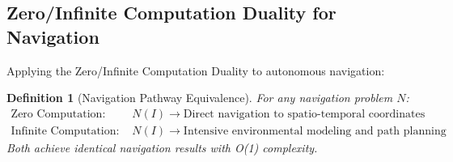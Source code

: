 \documentclass[12pt,a4paper]{article}
\newtheorem{definition}[theorem]{Definition}
\begin{document}
\subsection{Zero/Infinite Computation Duality for Navigation}

Applying the Zero/Infinite Computation Duality to autonomous navigation:

\begin{definition}[Navigation Pathway Equivalence]
For any navigation problem $N$:
\begin{align}
\text{Zero Computation:} \quad &N(I) \to \text{Direct navigation to spatio-temporal coordinates} \\
\text{Infinite Computation:} \quad &N(I) \to \text{Intensive environmental modeling and path planning}
\end{align}
Both achieve identical navigation results with O(1) complexity.
\end{definition}
\end{document}
